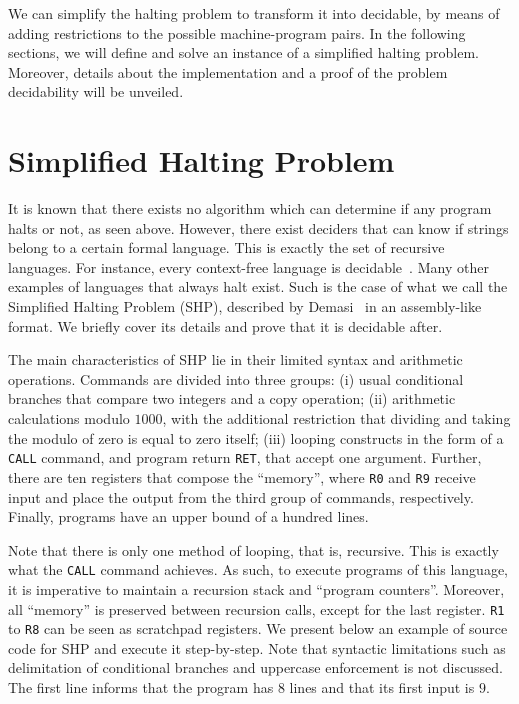 \documentclass[12pt]{article}
\begin{document}
We can simplify the halting problem to transform it into decidable, by means of
adding restrictions to the possible machine-program pairs. In the following
sections, we will define and solve an instance of a simplified halting problem.
Moreover, details about the implementation and a proof of the problem
decidability will be unveiled.

\section{Simplified Halting Problem}\label{sec:halting}

It is known that there exists no algorithm which can determine if any program
halts or not, as seen above. However, there exist deciders that can know if
strings belong to a certain formal language. This is exactly the set of
recursive languages. For instance, every context-free language is
decidable~\cite[Theorem 4.9]{Sipser:book:2012}. Many other examples of
languages that always halt exist. Such is the case of what we call the
Simplified Halting Problem (SHP), described by
Demasi~\cite{Demasi:misc:2013:may} in an assembly-like format. We briefly cover
its details and prove that it is decidable after.

The main characteristics of SHP lie in their limited syntax and arithmetic
operations. Commands are divided into three groups: (i) usual conditional
branches that compare two integers and a copy operation; (ii) arithmetic
calculations modulo $1000$, with the additional restriction that dividing and
taking the modulo of zero is equal to zero itself; (iii) looping constructs in
the form of a \texttt{CALL} command, and program return \texttt{RET}, that
accept one argument. Further, there are ten registers that compose the
``memory'', where \texttt{R0} and \texttt{R9} receive input and place the
output from the third group of commands, respectively. Finally, programs have
an upper bound of a hundred lines.

Note that there is only one method of looping, that is, recursive. This is
exactly what the \texttt{CALL} command achieves. As such, to execute programs
of this language, it is imperative to maintain a recursion stack and ``program
counters''. Moreover, all ``memory'' is preserved between recursion calls,
except for the last register. \texttt{R1} to \texttt{R8} can be seen as
scratchpad registers. We present below an example of source code for SHP and
execute it step-by-step. Note that syntactic limitations such as delimitation
of conditional branches and uppercase enforcement is not discussed. The first
line informs that the program has $8$ lines and that its first input is $9$.
\end{document}
